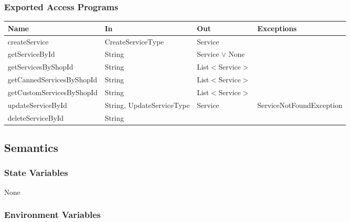\documentclass[12pt, titlepage]{article}
\begin{document}
\subsubsection{Exported Access Programs}

\begin{center}
	\begin{adjustbox}{width=\textwidth}
		\begin{tabular}{llll}
			\hline
			\textbf{Name}             & \textbf{In}               & \textbf{Out}        & \textbf{Exceptions}      \\
			\hline
			createService             & CreateServiceType         & Service             & ~                        \\
			getServiceById            & String                    & Service $\lor$ None & ~                        \\
			getServicesByShopId       & String                    & List$<$Service$>$   & ~                        \\
			getCannedServicesByShopId & String                    & List$<$Service$>$   & ~                        \\
			getCustomServicesByShopId & String                    & List$<$Service$>$   & ~                        \\
			updateServiceById         & String, UpdateServiceType & Service             & ServiceNotFoundException \\
			deleteServiceById         & String                    & ~                   & ~                        \\
			\hline
		\end{tabular}
	\end{adjustbox}
\end{center}

\subsection{Semantics}

\subsubsection{State Variables}

None

\subsubsection{Environment Variables}
\end{document}
